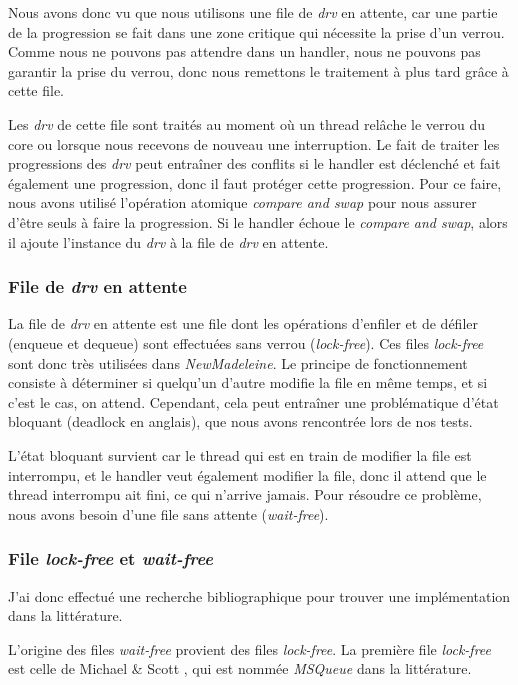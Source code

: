 Nous avons donc vu que nous utilisons une file de \emph{drv} en attente,
car une partie de la progression se fait dans une zone critique qui nécessite la prise d'un verrou.
Comme nous ne pouvons pas attendre dans un handler, nous ne pouvons pas garantir la prise du verrou,
donc nous remettons le traitement à plus tard grâce à cette file.

Les \emph{drv} de cette file sont traités au moment où un thread relâche le verrou du core ou lorsque nous recevons de nouveau une interruption.
Le fait de traiter les progressions des \emph{drv} peut entraîner des conflits si le handler est déclenché et
fait également une progression, donc il faut protéger cette progression.
Pour ce faire, nous avons utilisé l'opération atomique \emph{compare and swap} pour nous assurer d'être seuls à faire la progression.
Si le handler échoue le \emph{compare and swap}, alors il ajoute l'instance du \emph{drv} à la file de \emph{drv} en attente.

\subsubsection{File de \emph{drv} en attente}

La file de \emph{drv} en attente est une file dont les opérations d'enfiler et de défiler (enqueue et dequeue) sont effectuées sans verrou (\emph{lock-free}).
Ces files \emph{lock-free} sont donc très utilisées dans \emph{NewMadeleine}.
Le principe de fonctionnement consiste à déterminer si quelqu'un d'autre modifie la file en même temps, et si c'est le cas, on attend.
Cependant, cela peut entraîner une problématique d'état bloquant (deadlock en anglais),
que nous avons rencontrée lors de nos tests.

L'état bloquant survient car le thread qui est en train de modifier la file est interrompu,
et le handler veut également modifier la file, donc il attend que le thread interrompu ait fini, ce qui n'arrive jamais.
Pour résoudre ce problème, nous avons besoin d'une file sans attente (\emph{wait-free}).

\subsubsection{File \emph{lock-free} et \emph{wait-free}}

J'ai donc effectué une recherche bibliographique pour trouver une implémentation dans la littérature.

L'origine des files \emph{wait-free} provient des files \emph{lock-free}.
La première file \emph{lock-free} est celle de Michael \& Scott \cite{MICHAEL19981}, qui est nommée \emph{MSQueue} dans la littérature.

